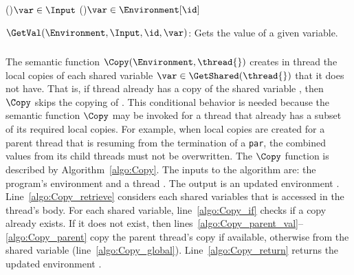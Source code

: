 \begin{algorithm}
	
	\BlankLine
	
	\uIf(){$\var \in \Input$} {
		\KwRet{$\Input[\var]$}						\label{algo:GetVal_input}
	} \uElseIf(){$\var \in \Environment[\id]$} {
				\label{algo:GetVal_local}
	} 
	
	\caption{$\GetVal(\Environment, \Input, \id, \var)$: Gets the value of a given variable.}
	\label{algo:GetVal}
\end{algorithm}

\subsubsection{}
\label{sec:forec_Copy}
The semantic function $\Copy(\Environment, \thread{})$
creates in thread \thread{} the local copies of each
shared variable $\var \in \GetShared(\thread{})$ 
that it does not have. That is, if thread
\thread{} already has a copy of the shared variable
\var{}, then $\Copy$ skips the copying of \var{}.
This conditional behavior is needed because the semantic
function $\Copy$ may be invoked for a thread \thread{} that
already has a subset of its required local copies. For
example, when local copies are created for a parent thread
that is resuming from the termination of a \texttt{par}, 
the combined values from its child threads
must not be overwritten. 
The $\Copy$ function is described
by Algorithm~\ref{algo:Copy}. The inputs to the algorithm
are: the program's environment \Environment{} and a thread
\thread{}. The output is an updated environment
\Environment{}. Line~\ref{algo:Copy_retrieve} considers 
each shared variables that is accessed in the thread's 
body. For each shared
variable\footnotemark[1], line~\ref{algo:Copy_if} checks if
a copy already exists. If it does not exist, then 
lines~\ref{algo:Copy_parent_val}--\ref{algo:Copy_parent}
copy the parent thread's copy if available, 
otherwise from the shared variable 
(line~\ref{algo:Copy_global}). Line~\ref{algo:Copy_return}
returns the updated environment \Environment{}.

